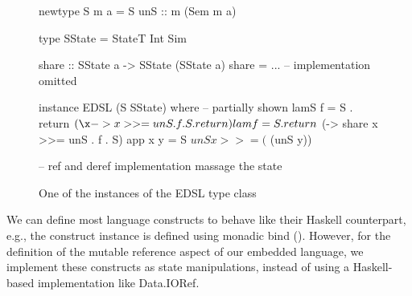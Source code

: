\begin{figure}
\begin{code}
newtype S m a = S { unS :: m (Sem m a) }

type SState = StateT Int Sim

share :: SState a -> SState (SState a)
share = ... -- implementation omitted

instance EDSL (S SState) where -- partially shown
  lamS f       = S . return $ (\x -> x >>= unS . f . S . return)
  lam f        = S . return $ (\x -> share x >>= unS . f . S)
  app x y      = S $ unS x >>= ($ (unS y))

-- ref and deref implementation massage the state
\end{code}
\caption{One of the instances of the EDSL type class}
\label{fig:edsl-inst}
\end{figure}

We can define most language constructs to behave like their Haskell counterpart, e.g., the  construct instance is defined using monadic bind (\hs{>>=}\xspace).
However, for the definition of the mutable reference aspect of our
embedded language, we implement these constructs as %
state manipulations, 
instead of using a Haskell-based implementation like \textsf{Data.IORef}.






